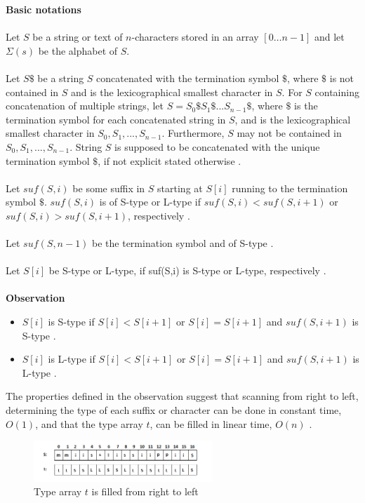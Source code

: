\documentclass[12pt]{article} %
\begin{document}
\textbf{Basic notations}
\\ \\
Let $S$ be a string or text of $n$-characters stored in an array $[0…n-1]$ and let $\Sigma(s)$ be the alphabet of $S$. 
\\ \\
Let $S$$\$$ be a string $S$ concatenated with the termination symbol $\$$, where $\$$ is not contained in $S$ and is the lexicographical smallest character in $S$. For $S$ containing concatenation of multiple strings, let $S={S_0\$S_1\$...S_{n-1}\$}$, where $\$$ is the termination symbol for each concatenated string in $S$, and is the lexicographical smallest character in $S_0,S_1,...,S_{n-1}$. Furthermore, $S$ may not be contained in $S_0,S_1,...,S_{n-1}$. String $S$ is supposed to be concatenated with the unique termination symbol $\$$, if not explicit   stated otherwise \cite{twoeffecient}.
\\ \\
Let $suf(S,i)$ be some suffix in $S$ starting at $S[i]$ running to the termination symbol $\$$. $suf(S,i)$ is of S-type or L-type if $suf(S,i) < suf(S,i+1)$ or $suf(S,i) > suf(S,i+1)$, respectively \cite{twoeffecient}.
\\ \\
Let $suf(S, n-1)$ be the termination symbol and of S-type \cite{twoeffecient}.
\\ \\
Let $S[i]$ be S-type or L-type, if suf(S,i) is S-type or L-type, respectively \cite{twoeffecient}.
\\ \\
\textbf{Observation}
\begin{itemize}
  \item $S[i]$ is  S-type if $S[i] < S[i+1]$ or $S[i] = S[i+1]$ and $suf(S, i+1)$ is S-type \cite{twoeffecient}.
  \item $S[i]$ is  L-type if $S[i] < S[i+1]$ or $S[i] = S[i+1]$ and $suf(S, i+1)$ is L-type \cite{twoeffecient}.
\end{itemize}

The properties defined in the observation suggest that scanning from right to left, determining the type of each suffix or character can be done in constant time, $O(1)$, and that the type array $t$, can be filled in linear time, $O(n)$ \cite{twoeffecient}.

\begin{figure}[H]
    \centering
    \includegraphics[width=0.6\textwidth]{SAISmmii1}
    \captionsetup{width=0.8\textwidth}
    \caption{Type array $t$ is filled from right to left}
    \label{fig:SAISmmii1}
\end{figure}
\end{document}

